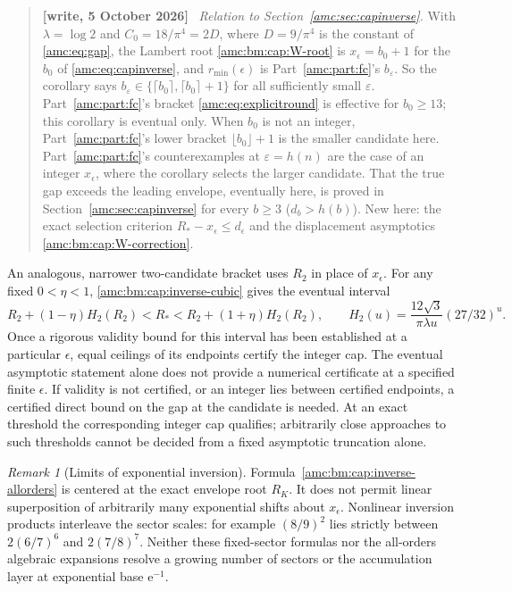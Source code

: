 \documentclass[11pt,letterpaper]{article}
\theoremstyle{remark}\newtheorem{remark}[theorem]{Remark}
\newcommand{\ee}{\mathrm e}
\newenvironment{writenotedated}[1]{\par\smallskip\begin{quote}\small\textbf{[write, #1]}\ }{\end{quote}\smallskip}
\begin{document}
\begin{writenotedated}{5 October 2026}
\emph{Relation to Section~\ref{amc:sec:capinverse}.} With $\lambda=\log2$ and $C_0=18/\pi^4=2D$, where $D=9/\pi^4$ is the constant of \eqref{amc:eq:gap}, the Lambert root \eqref{amc:bm:cap:W-root} is $x_\epsilon=b_0+1$ for the $b_0$ of \eqref{amc:eq:capinverse}, and $r_{\min}(\epsilon)$ is Part~\ref{amc:part:fc}'s $b_\varepsilon$. So the corollary says $b_\varepsilon\in\{\lceil b_0\rceil,\lceil b_0\rceil+1\}$ for all sufficiently small $\varepsilon$. Part~\ref{amc:part:fc}'s bracket \eqref{amc:eq:explicitround} is effective for $b_0\ge13$; this corollary is eventual only. When $b_0$ is not an integer, Part~\ref{amc:part:fc}'s lower bracket $\lfloor b_0\rfloor+1$ is the smaller candidate here. Part~\ref{amc:part:fc}'s counterexamples at $\varepsilon=h(n)$ are the case of an integer $x_\epsilon$, where the corollary selects the larger candidate. That the true gap exceeds the leading envelope, eventually here, is proved in Section~\ref{amc:sec:capinverse} for every $b\ge3$ ($d_b>h(b)$). New here: the exact selection criterion $R_*-x_\epsilon\le d_\epsilon$ and the displacement asymptotics \eqref{amc:bm:cap:W-correction}.
\end{writenotedated}
An analogous, narrower two-candidate bracket uses $R_2$ in place of $x_\epsilon$. For any fixed $0<\eta<1$, \eqref{amc:bm:cap:inverse-cubic} gives the eventual interval
\[
 R_2+(1-\eta)H_2(R_2)<R_*<R_2+(1+\eta)H_2(R_2),\qquad
 H_2(u)=\frac{12\sqrt3}{\pi\lambda u}(27/32)^u.
\]
Once a rigorous validity bound for this interval has been established at a particular $\epsilon$, equal ceilings of its endpoints certify the integer cap. The eventual asymptotic statement alone does not provide a numerical certificate at a specified finite $\epsilon$. If validity is not certified, or an integer lies between certified endpoints, a certified direct bound on the gap at the candidate is needed. At an exact threshold the corresponding integer cap qualifies; arbitrarily close approaches to such thresholds cannot be decided from a fixed asymptotic truncation alone.

\begin{remark}[Limits of exponential inversion]
Formula~\eqref{amc:bm:cap:inverse-allorders} is centered at the exact envelope root $R_K$. It does not permit linear superposition of arbitrarily many exponential shifts about $x_\epsilon$. Nonlinear inversion products interleave the sector scales: for example $(8/9)^2$ lies strictly between $2(6/7)^6$ and $2(7/8)^7$. Neither these fixed-sector formulas nor the all-orders algebraic expansions resolve a growing number of sectors or the accumulation layer at exponential base $\ee^{-1}$.
\end{remark}
\end{document}
